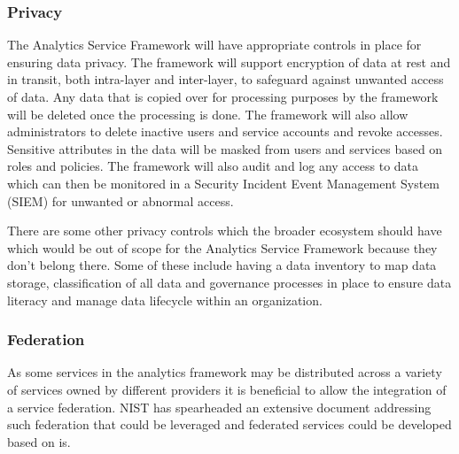 \subsubsection{Privacy}\label{sec:privacy}

The Analytics Service Framework will have appropriate controls in place for ensuring data privacy. The framework will support encryption of data at rest and in transit, both intra-layer and inter-layer, to safeguard against unwanted access of data. Any data that is copied over for processing purposes by the framework will be deleted once the processing is done. The framework will also allow administrators to delete inactive users and service accounts and revoke accesses. Sensitive attributes in the data will be masked from users and services based on roles and policies. The framework will also audit and log any access to data which can then be monitored in a Security Incident Event Management System (SIEM) for unwanted or abnormal access. 

There are some other privacy controls which the broader ecosystem should have which would be out of scope for the Analytics Service Framework because they don't belong there. Some of these include having a data inventory to map data storage, classification of all data and governance processes in place to ensure data literacy and manage data lifecycle within an organization. 

\subsubsection{Federation}

As some services in the analytics framework may be distributed across a variety of services owned by different providers it is beneficial to allow the integration of a service federation. NIST has spearheaded an extensive document \cite{nist-Lee2020} addressing such federation that could be leveraged and federated services could be developed based on is. 

\begin{comment}
\subsubsection{Artifacts}

function
data
logs / audit

\subsubsection{Privacy}

privacy
    input
    output
    function
    
asynchronous events, how does privacy apply
batch functions
streaming functions

data
\end{comment}